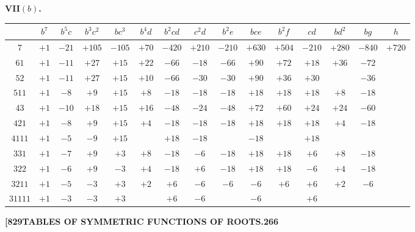 \documentclass[11pt,a4paper]{book}
\begin{document}
\medskip

\noindent\textbf{VII$(b)$.}
\begin{center}
\small
\begin{tabular}{c|c|c|c|c|c|c|c|c|c|c|c|c|c|c}
& $b^7$ & $b^5c$ & $b^3c^2$ & $bc^3$ & $b^4d$ & $b^2cd$ & $c^2d$ & $b^2e$ & $bce$ & $b^2f$ & $cd$ & $bd^2$ & $bg$ & $h$ \\
\hline
$7$ & $+1$ & $-21$ & $+105$ & $-105$ & $+70$ & $-420$ & $+210$ & $-210$ & $+630$ & $+504$ & $-210$ & $+280$ & $-840$ & $+720$ \\
$61$ & $+1$ & $-11$ & $+27$ & $+15$ & $+22$ & $-66$ & $-18$ & $-66$ & $+90$ & $+72$ & $+18$ & $+36$ & $-72$ & \\
$52$ & $+1$ & $-11$ & $+27$ & $+15$ & $+10$ & $-66$ & $-30$ & $-30$ & $+90$ & $+36$ & $+30$ & & $-36$ & \\
$511$ & $+1$ & $-8$ & $+9$ & $+15$ & $+8$ & $-18$ & $-18$ & $-18$ & $+18$ & $+18$ & $+18$ & $+8$ & $-18$ & \\
$43$ & $+1$ & $-10$ & $+18$ & $+15$ & $+16$ & $-48$ & $-24$ & $-48$ & $+72$ & $+60$ & $+24$ & $+24$ & $-60$ & \\
$421$ & $+1$ & $-8$ & $+9$ & $+15$ & $+4$ & $-18$ & $-18$ & $-18$ & $+18$ & $+18$ & $+18$ & $+4$ & $-18$ & \\
$4111$ & $+1$ & $-5$ & $-9$ & $+15$ & & $+18$ & $-18$ & & $-18$ & & $+18$ & & & \\
$331$ & $+1$ & $-7$ & $+9$ & $+3$ & $+8$ & $-18$ & $-6$ & $-18$ & $+18$ & $+18$ & $+6$ & $+8$ & $-18$ & \\
$322$ & $+1$ & $-6$ & $+9$ & $-3$ & $+4$ & $-18$ & $+6$ & $-18$ & $+18$ & $+18$ & $-6$ & $+4$ & $-18$ & \\
$3211$ & $+1$ & $-5$ & $-3$ & $+3$ & $+2$ & $+6$ & $-6$ & $-6$ & $-6$ & $+6$ & $+6$ & $+2$ & $-6$ & \\
$31111$ & $+1$ & $-3$ & $-3$ & $+3$ & & $+6$ & $-6$ & & $-6$ & & $+6$ & & &
\end{tabular}
\end{center}

\newpage
\setcounter{page}{266}

\noindent\textbf{[829}\hfill\textbf{TABLES OF SYMMETRIC FUNCTIONS OF ROOTS.}\hfill\textbf{266}

\bigskip
\end{document}
